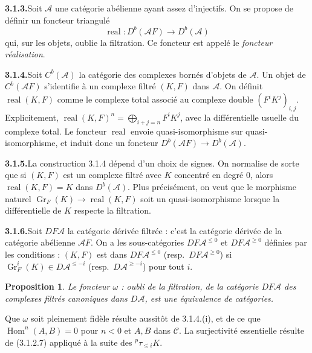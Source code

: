 \documentclass[12pt,a4paper]{article}
\theoremstyle{plain}
\newtheorem{proposition}[theorem]{Proposition}
\theoremstyle{definition}
\DeclareMathOperator{\Hom}{Hom}
\DeclareMathOperator{\real}{real}
\DeclareMathOperator{\Gr}{Gr}
\begin{document}
\smallskip
\noindent\textbf{3.1.3.}\quad Soit $\mathcal{A}$ une cat\'egorie ab\'elienne ayant assez d'injectifs. On se propose de d\'efinir un foncteur triangul\'e
\[
\real : D^b(\mathcal{A}F) \to D^b(\mathcal{A})
\]
qui, sur les objets, oublie la filtration. Ce foncteur est appel\'e le \emph{foncteur r\'ealisation}.

\smallskip
\noindent\textbf{3.1.4.}\quad Soit $C^b(\mathcal{A})$ la cat\'egorie des complexes born\'es d'objets de $\mathcal{A}$. Un objet de $C^b(\mathcal{A}F)$ s'identifie \`a un complexe filtr\'e $(K, F)$ dans $\mathcal{A}$. On d\'efinit $\real(K, F)$ comme le complexe total associ\'e au complexe double $(F^i K^j)_{i,j}$. Explicitement, $\real(K, F)^n = \bigoplus_{i+j=n} F^i K^j$, avec la diff\'erentielle usuelle du complexe total. Le foncteur $\real$ envoie quasi-isomorphisme sur quasi-isomorphisme, et induit donc un foncteur $D^b(\mathcal{A}F) \to D^b(\mathcal{A})$.

\smallskip
\noindent\textbf{3.1.5.}\quad La construction 3.1.4 d\'epend d'un choix de signes. On normalise de sorte que si $(K, F)$ est un complexe filtr\'e avec $K$ concentr\'e en degr\'e 0, alors $\real(K, F) = K$ dans $D^b(\mathcal{A})$. Plus pr\'ecis\'ement, on veut que le morphisme naturel $\Gr_F(K) \to \real(K, F)$ soit un quasi-isomorphisme lorsque la diff\'erentielle de $K$ respecte la filtration.

\smallskip
\noindent\textbf{3.1.6.}\quad Soit $DF\mathcal{A}$ la cat\'egorie d\'eriv\'ee filtr\'ee : c'est la cat\'egorie d\'eriv\'ee de la cat\'egorie ab\'elienne $\mathcal{A}F$. On a les sous-cat\'egories $DF\mathcal{A}^{\leqslant 0}$ et $DF\mathcal{A}^{\geqslant 0}$ d\'efinies par les conditions : $(K, F)$ est dans $DF\mathcal{A}^{\leqslant 0}$ (resp.\ $DF\mathcal{A}^{\geqslant 0}$) si $\Gr_F^i(K) \in D\mathcal{A}^{\leqslant -i}$ (resp.\ $D\mathcal{A}^{\geqslant -i}$) pour tout $i$.

\begin{proposition}\label{prop:3.1.6}
Le foncteur $\omega$ : oubli de la filtration, de la cat\'egorie $DF\mathcal{A}$ des complexes filtr\'es canoniques dans $D\mathcal{A}$, est une \'equivalence de cat\'egories.
\end{proposition}

Que $\omega$ soit pleinement fid\`ele r\'esulte aussit\^ot de 3.1.4.(i), et de ce que $\Hom^n(A,B) = 0$ pour $n < 0$ et $A, B$ dans $\mathcal{C}$. La surjectivit\'e essentielle r\'esulte de (3.1.2.7) appliqu\'e \`a la suite des ${}^p \tau_{\leqslant i} K$.
\end{document}
